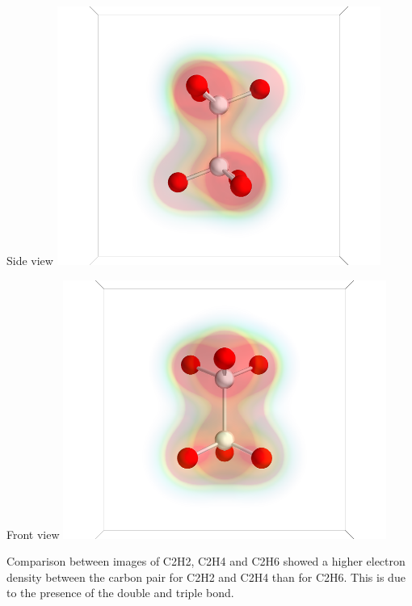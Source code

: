 \documentclass[11pt]{article}
\begin{document}
\begin{itemize}
Side view
\includegraphics[width=.9\linewidth]{./images/C2H6_side.png}

Front view
\includegraphics[width=.9\linewidth]{./images/C2H6_front.png}

Comparison between images of C2H2, C2H4 and C2H6 showed a higher electron density between the carbon pair for C2H2 and C2H4 than for C2H6.  This is due to the presence of the double and triple bond.



\end{itemize}
\end{document}
